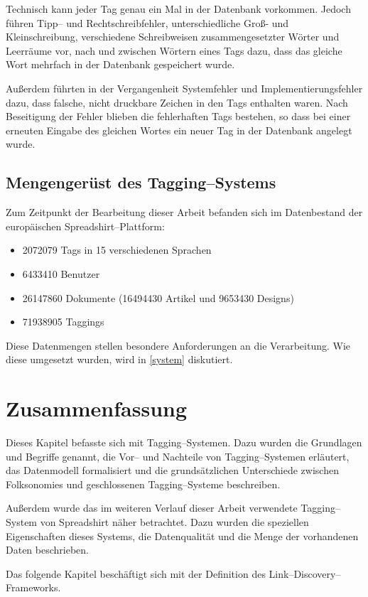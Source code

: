 Technisch kann jeder Tag genau ein Mal in der Datenbank vorkommen. Jedoch führen Tipp-- und Rechtschreibfehler, unterschiedliche Groß- und Kleinschreibung, verschiedene Schreibweisen zusammengesetzter Wörter und Leerräume vor, nach und zwischen Wörtern eines Tags dazu, dass das gleiche Wort mehrfach in der Datenbank gespeichert wurde.

Außerdem führten in der Vergangenheit Systemfehler und Implementierungsfehler dazu, dass falsche, nicht druckbare Zeichen in den Tags enthalten waren. Nach Beseitigung der Fehler blieben die fehlerhaften Tags bestehen, so dass bei einer erneuten Eingabe des gleichen Wortes ein neuer Tag in der Datenbank angelegt wurde.

\subsection{Mengengerüst des Tagging--Systems}
\label{tag_amount}

Zum Zeitpunkt der Bearbeitung dieser Arbeit befanden sich im Datenbestand der europäischen Spreadshirt--Plattform:

\begin{itemize}
    \item \num{2072079} Tags in \num{15} verschiedenen Sprachen
    \item \num{6433410} Benutzer
    \item \num{26147860} Dokumente (\num{16494430} Artikel und \num{9653430} Designs)
    \item \num{71938905} Taggings
\end{itemize}

Diese Datenmengen stellen besondere Anforderungen an die Verarbeitung. Wie diese umgesetzt wurden, wird in \cref{system} diskutiert.

\section{Zusammenfassung}

Dieses Kapitel befasste sich mit Tagging--Systemen. Dazu wurden die Grundlagen und Begriffe genannt, die Vor-- und Nachteile von Tagging--Systemen erläutert, das Datenmodell formalisiert und die grundsätzlichen Unterschiede zwischen Folksonomies und geschlossenen Tagging--Systeme beschreiben.

Außerdem wurde das im weiteren Verlauf dieser Arbeit verwendete Tagging--System von Spreadshirt \cite{sprd2013} näher betrachtet. Dazu wurden die speziellen Eigenschaften dieses Systems, die Datenqualität und die Menge der vorhandenen Daten beschrieben.

Das folgende Kapitel beschäftigt sich mit der Definition des Link--Discovery--Frameworks.